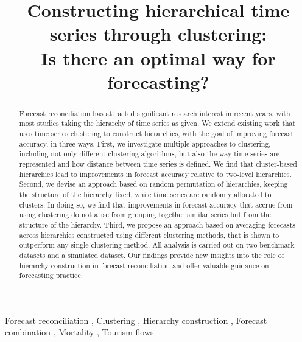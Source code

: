 \documentclass[a4paper,review,12pt,authoryear]{elsarticle}
\begin{document}
\begin{frontmatter}

\title{Constructing hierarchical time series through clustering: \\Is there an optimal way for forecasting?}




  \begin{abstract}

    Forecast reconciliation has attracted significant research interest in recent years, with most studies taking the hierarchy of time series as given. We extend existing work that uses time series clustering to construct hierarchies, with the goal of improving forecast accuracy, in three ways. First, we investigate multiple approaches to clustering, including not only different clustering algorithms, but also the way time series are represented and how distance between time series is defined. We find that cluster-based hierarchies lead to improvements in forecast accuracy relative to two-level hierarchies. Second, we devise an approach based on random permutation of hierarchies, keeping the structure of the hierarchy fixed, while time series are randomly allocated to clusters. In doing so, we find that improvements in forecast accuracy that accrue from using clustering do not arise from grouping together similar series but from the structure of the hierarchy. Third, we propose an approach based on averaging forecasts across hierarchies constructed using different clustering methods, that is shown to outperform any single clustering method. All analysis is carried out on two benchmark datasets and a simulated dataset. Our findings provide new insights into the role of hierarchy construction in forecast reconciliation and offer valuable guidance on forecasting practice. \\

  \end{abstract}

  \begin{keyword}
  Forecast reconciliation \sep
  Clustering \sep
  Hierarchy construction \sep
  Forecast combination \sep
  Mortality \sep
  Tourism flows
  \end{keyword}

\end{frontmatter}
\end{document}
